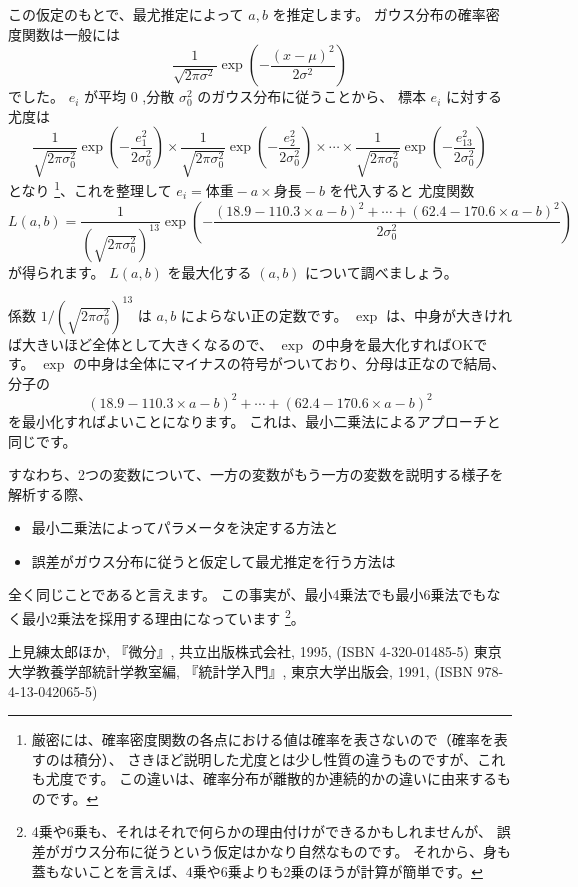 \documentclass[uplatex,dvipdfmx]{jsarticle}
\begin{document}
  この仮定のもとで、最尤推定によって $a, b$ を推定します。
  ガウス分布の確率密度関数は一般には
  \[
    \frac{1}{\sqrt{2\pi\sigma^2}} \exp(-\frac{(x-\mu)^2}{2\sigma^2})
  \]
  でした。
  $e_i$ が平均 $0$ ,分散 $\sigma_0^2$ のガウス分布に従うことから、
  標本 $e_i$ に対する尤度は
  \[
    \frac{1}{\sqrt{2\pi\sigma_0^2}} \exp(-\frac{e_1^2}{2\sigma_0^2})
    \times
    \frac{1}{\sqrt{2\pi\sigma_0^2}} \exp(-\frac{e_2^2}{2\sigma_0^2})
    \times \cdots \times
    \frac{1}{\sqrt{2\pi\sigma_0^2}} \exp(-\frac{e_{13}^2}{2\sigma_0^2})
  \]
  となり
  \footnote{
    厳密には、確率密度関数の各点における値は確率を表さないので（確率を表すのは積分）、
    さきほど説明した尤度とは少し性質の違うものですが、これも尤度です。
    この違いは、確率分布が離散的か連続的かの違いに由来するものです。
  }、これを整理して $e_i = \mbox{体重} - a \times \mbox{身長} -b$ を代入すると
  尤度関数
  \[
    L(a,b) = \frac{1}{(\sqrt{2\pi\sigma_0^2})^{13}} \exp(-\frac{(18.9-110.3 \times a -b)^2+\cdots+(62.4-170.6 \times a -b)^2}{2\sigma_0^2})
  \]
  が得られます。
  $L(a,b)$ を最大化する $(a, b)$ について調べましょう。

  係数 $1/(\sqrt{2\pi\sigma_0^2})^{13}$ は $a, b$ によらない正の定数です。
  $\exp$ は、中身が大きければ大きいほど全体として大きくなるので、 $\exp$ の中身を最大化すればOKです。
  $\exp$ の中身は全体にマイナスの符号がついており、分母は正なので結局、分子の
  \[
    (18.9-110.3 \times a -b)^2+\cdots+(62.4-170.6 \times a -b)^2
  \]
  を最小化すればよいことになります。
  これは、最小二乗法によるアプローチと同じです。

  すなわち、2つの変数について、一方の変数がもう一方の変数を説明する様子を解析する際、
  \begin{itemize}
    \item 最小二乗法によってパラメータを決定する方法と
    \item 誤差がガウス分布に従うと仮定して最尤推定を行う方法は
  \end{itemize}
  全く同じことであると言えます。
  この事実が、最小4乗法でも最小6乗法でもなく最小2乗法を採用する理由になっています
  \footnote{
    4乗や6乗も、それはそれで何らかの理由付けができるかもしれませんが、
    誤差がガウス分布に従うという仮定はかなり自然なものです。
    それから、身も蓋もないことを言えば、4乗や6乗よりも2乗のほうが計算が簡単です。
  }。

\begin{thebibliography}{9}
   上見練太郎ほか, 『微分』, 共立出版株式会社, 1995, (ISBN 4-320-01485-5)
   東京大学教養学部統計学教室編, 『統計学入門』, 東京大学出版会, 1991, (ISBN 978-4-13-042065-5)
\end{thebibliography}
\end{document}
